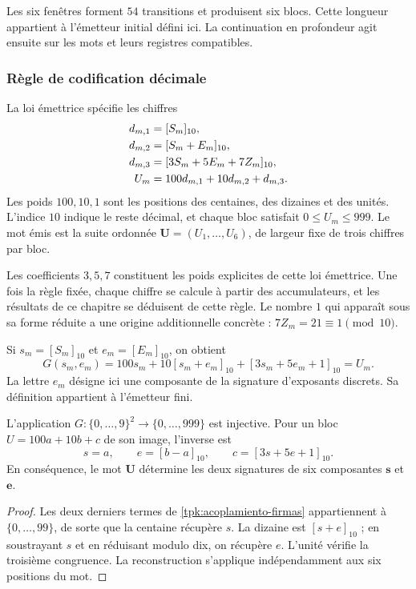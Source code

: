 Les six fenêtres forment \(54\) transitions et produisent six blocs.  
Cette longueur appartient à l'émetteur initial défini ici. La continuation  
en profondeur agit ensuite sur les mots et leurs registres compatibles.

\subsubsection{Règle de codification décimale}

La loi émettrice spécifie les chiffres
\begin{align}
 d_{m,1}&=[S_m]_{10},\notag\\
 d_{m,2}&=[S_m+E_m]_{10},\notag\\
 d_{m,3}&=[3S_m+5E_m+7Z_m]_{10},\notag\\
 U_m&=100d_{m,1}+10d_{m,2}+d_{m,3}.
 \label{tpk:bloque-decimal}
\end{align}
Les poids \(100,10,1\) sont les positions des centaines, des dizaines et des unités.
L'indice \(10\) indique le reste décimal, et chaque bloc satisfait
\(0\leq U_m\leq999\). Le mot émis est la suite ordonnée
\(\mathbf U=(U_1,\ldots,U_6)\), de largeur fixe de trois chiffres par bloc.

Les coefficients \(3,5,7\) constituent les poids explicites de cette loi
émettrice. Une fois la règle fixée, chaque chiffre se calcule à partir des
accumulateurs, et les résultats de ce chapitre se déduisent de cette règle.
Le nombre \(1\) qui apparaît sous sa forme réduite a une origine
additionnelle concrète : \(7Z_m=21\equiv1\pmod{10}\).

Si \(s_m=[S_m]_{10}\) et \(e_m=[E_m]_{10}\), on obtient
\begin{equation}
 G(s_m,e_m)=100s_m+10[s_m+e_m]_{10}
                   +[3s_m+5e_m+1]_{10}=U_m.
 \label{tpk:acoplamiento-firmas}
\end{equation}
La lettre \(e_m\) désigne ici une composante de la signature d'exposants discrets. Sa définition appartient à l'émetteur fini.

\begin{proposicion}
\label{tpk:recuperacion-firmas}
L'application \(G:\{0,\ldots,9\}^2\to\{0,\ldots,999\}\) est injective.
Pour un bloc \(U=100a+10b+c\) de son image, l'inverse est
\[
 s=a,\qquad e=[b-a]_{10},\qquad
 c=[3s+5e+1]_{10}.
\]
En conséquence, le mot \(\mathbf U\) détermine les deux signatures de six composantes \(\mathbf s\) et \(\mathbf e\).
\end{proposicion}
\begin{proof}
Les deux derniers termes de \eqref{tpk:acoplamiento-firmas} appartiennent à
\(\{0,\ldots,99\}\), de sorte que la centaine récupère \(s\). La dizaine
est \([s+e]_{10}\) ; en soustrayant \(s\) et en réduisant modulo dix, on récupère
\(e\). L'unité vérifie la troisième congruence. La reconstruction s'applique
indépendamment aux six positions du mot.
\end{proof}

